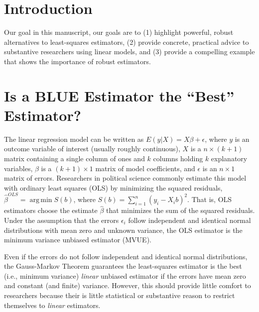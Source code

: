 \documentclass[12pt]{article}
\DeclareMathOperator*{\argmin}{arg\,min}
\begin{document}


\thispagestyle{empty}

\newpage
\doublespace

\section*{Introduction}

Our goal in this manuscript, our goals are to (1) highlight powerful, robust alternatives to least-squares estimators, (2) provide concrete, practical advice to substantive researchers using linear models, and (3) provide a compelling example that shows the importance of robust estimators.

\section*{Is a BLUE Estimator the ``Best'' Estimator?}

The linear regression model can be written as $E(y | X) = X\beta + \epsilon$, where $y$ is an outcome variable of interest (usually roughly continuous), $X$ is a $n \times (k + 1)$ matrix containing a single column of ones and $k$ columns holding $k$ explanatory variables, $\beta$ is a $(k + 1) \times 1$ matrix of model coefficients, and $\epsilon$ is an $n \times 1$ matrix of errors. Researchers in political science commonly estimate this model with ordinary least squares (OLS) by minimizing the squared residuals, $\hat{\beta}^{OLS} = \argmin S(b)$, where $S(b) = \sum_{i = 1}^n(y_i - X_ib)^2$. That is, OLS estimators choose the estimate $\hat{\beta}$ that minimizes the sum of the squared residuals. Under the assumption that the errors $\epsilon_i$ follow independent and identical normal distributions with mean zero and unknown variance, the OLS estimator is the minimum variance unbiased estimator (MVUE).

Even if the errors do not follow independent and identical normal distributions, the Gauss-Markov Theorem guarantees the least-squares estimator is the best (i.e., minimum variance) \textit{linear} unbiased estimator if the errors have mean zero and constant (and finite) variance. However, this should provide little comfort to researchers because their is little statistical or substantive reason to restrict themselves to \textit{linear} estimators.
\end{document}
